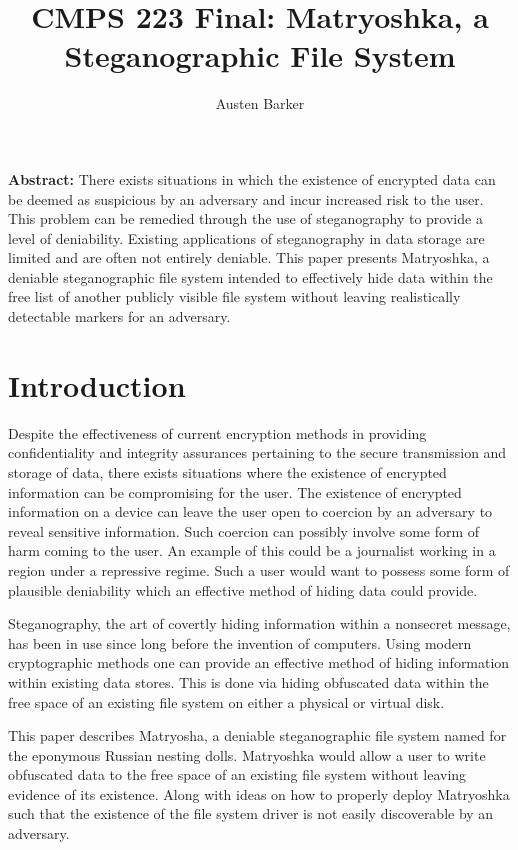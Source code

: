 \documentclass{article}
\begin{document}
\title{CMPS 223 Final: Matryoshka, a Steganographic File System}
\author{Austen Barker}
\maketitle

\begin{multicols}{2}

\textbf{Abstract:} There exists situations in which the existence of encrypted data can be deemed as suspicious by an adversary and incur increased risk to the user. This problem can be remedied through the use of steganography to provide a level of deniability. Existing applications of steganography in data storage are limited and are often not entirely deniable. This paper presents Matryoshka, a deniable steganographic file system intended to effectively hide data within the free list of another publicly visible file system without leaving realistically detectable markers for an adversary. 

\section{Introduction}

Despite the effectiveness of current encryption methods in providing confidentiality and integrity assurances pertaining to the secure transmission and storage of data, there exists situations where the existence of encrypted information can be compromising for the user. The existence of encrypted information on a device can leave the user open to coercion by an adversary to reveal sensitive information. Such coercion can possibly involve some form of harm coming to the user. An example of this could be a journalist working in a region under a repressive regime. Such a user would want to possess some form of plausible deniability which an effective method of hiding data could provide. 

Steganography, the art of covertly hiding information within a nonsecret message, has been in use since long before the invention of computers. Using modern cryptographic methods one can provide an effective method of hiding information within existing data stores. This is done via hiding obfuscated data within the free space of an existing file system on either a physical or virtual disk.

This paper describes Matryosha, a deniable steganographic file system named for the eponymous Russian nesting dolls. Matryoshka would allow a user to write obfuscated data to the free space of an existing file system without leaving evidence of its existence. Along with ideas on how to properly deploy Matryoshka such that the existence of the file system driver is not easily discoverable by an adversary.


\end{multicols}
\end{document}
